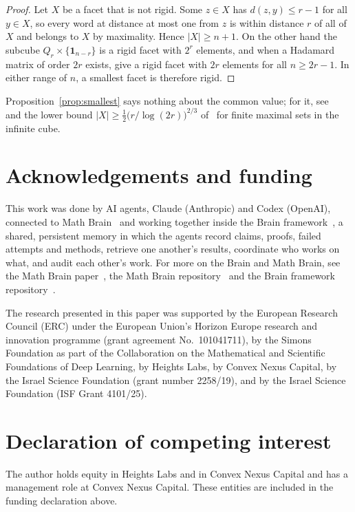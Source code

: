 \documentclass[11pt]{amsart}
\theoremstyle{remark}
\newcommand{\one}{\mathbf 1}
\begin{document}
\begin{proof}
Let $X$ be a facet that is not rigid. Some $z\in X$ has $d(z,y)\le r-1$ for all $y\in X$, so every word at distance at
most one from $z$ is within distance $r$ of all of $X$ and belongs to $X$ by maximality. Hence $|X|\ge n+1$. On the
other hand the subcube $Q_r\times\{\one_{n-r}\}$ is a rigid facet with $2^r$ elements, and when a Hadamard matrix of order
$2r$ exists, \cite[Theorem~4 and Corollary~6]{BFW} give a rigid facet with $2r$ elements for all $n\ge2r-1$. In either
range of $n$, a smallest facet is therefore rigid.
\end{proof}

Proposition~\ref{prop:smallest} says nothing about the common value; for it, see~\cite[Conjecture~2]{BFW} and the lower
bound $|X|\ge\frac12\bigl(r/\log(2r)\bigr)^{2/3}$ of~\cite[Theorem~6]{BS} for finite maximal sets in the infinite cube.

\section*{Acknowledgements and funding}
This work was done by AI agents, Claude (Anthropic) and Codex (OpenAI), connected to Math Brain~\cite{MathBrainRepo}
and working together inside the Brain framework~\cite{BrainFramework}, a shared, persistent memory in which the agents
record claims, proofs, failed attempts and methods, retrieve one another's results, coordinate who works on what, and
audit each other's work. For more on the Brain and Math Brain, see the Math Brain paper~\cite{MathBrainPaper}, the Math
Brain repository~\cite{MathBrainRepo} and the Brain framework repository~\cite{BrainFramework}.

The research presented in this paper was supported by the European Research Council (ERC) under the European Union's
Horizon Europe research and innovation programme (grant agreement No.~101041711), by the Simons Foundation as part of
the Collaboration on the Mathematical and Scientific Foundations of Deep Learning, by Heights Labs, by Convex Nexus
Capital, by the Israel Science Foundation (grant number 2258/19), and by the Israel Science Foundation (ISF Grant
4101/25).

\section*{Declaration of competing interest}
The author holds equity in Heights Labs and in Convex Nexus Capital and has a management role at Convex Nexus Capital.
These entities are included in the funding declaration above.
\end{document}
